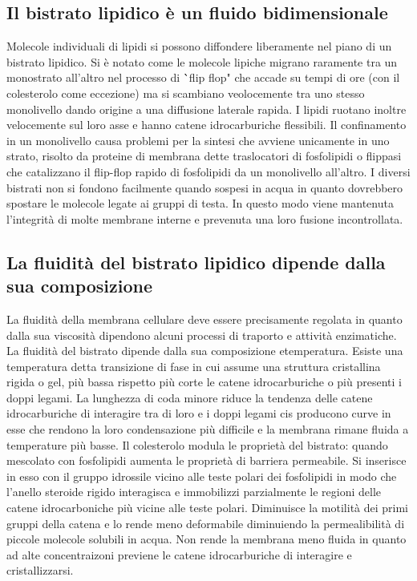 \subsection{Il bistrato lipidico \`e un fluido bidimensionale}
Molecole individuali di lipidi si possono diffondere liberamente nel piano di un bistrato lipidico. Si \`e notato come le molecole lipiche migrano 
raramente tra un monostrato all'altro nel processo di \``flip flop" che accade su tempi di ore (con il colesterolo come eccezione) ma si scambiano
veolocemente tra uno stesso monolivello dando origine a una diffusione laterale rapida. I lipidi ruotano inoltre velocemente sul loro asse e hanno 
catene idrocarburiche flessibili. Il confinamento in un monolivello causa problemi per la sintesi che avviene unicamente in uno strato, risolto da
proteine di membrana dette traslocatori di fosfolipidi o flippasi che catalizzano il flip-flop rapido di fosfolipidi da un monolivello all'altro. I 
diversi bistrati non si fondono facilmente quando sospesi in acqua in quanto dovrebbero spostare le molecole legate ai gruppi di testa. In questo modo
viene mantenuta l'integrit\`a di molte membrane interne e prevenuta una loro fusione incontrollata. 
\subsection{La fluidit\`a del bistrato lipidico dipende dalla sua composizione}
La fluidit\`a della membrana cellulare deve essere precisamente regolata in quanto dalla sua viscosit\`a dipendono alcuni processi di traporto e attivit\`a enzimatiche. La fluidit\`a del
bistrato dipende dalla sua composizione etemperatura.  Esiste una temperatura detta transizione di fase in cui assume una struttura cristallina rigida o gel, pi\`u bassa rispetto pi\`u 
corte le catene idrocarburiche o pi\`u presenti i doppi legami. La lunghezza di coda minore riduce la tendenza delle catene idrocarburiche di interagire tra di loro e i doppi legami
cis producono curve in esse che rendono la loro condensazione pi\`u difficile e la membrana rimane fluida a temperature pi\`u basse. Il colesterolo modula le propriet\`a del bistrato:
quando mescolato con fosfolipidi aumenta le propriet\`a di barriera permeabile. Si inserisce in esso con il gruppo idrossile vicino alle teste polari dei fosfolipidi in 
modo che l'anello steroide rigido interagisca e immobilizzi parzialmente le regioni delle catene idrocarboniche pi\`u vicine alle teste polari. Diminuisce la motilit\`a dei primi gruppi
 della catena e lo rende meno deformabile diminuiendo la permealibilit\`a di piccole molecole solubili in acqua. Non rende la membrana meno fluida in quanto ad alte 
concentraizoni previene le catene idrocarburiche di interagire e cristallizzarsi. 
